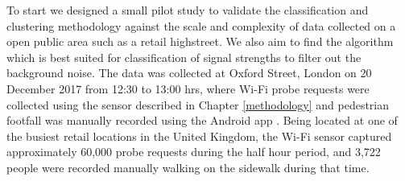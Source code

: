 To start we designed a small pilot study to validate the classification and clustering methodology against the scale and complexity of data collected on a open public area such as a retail highstreet.
We also aim to find the algorithm which is best suited for classification of signal strengths to filter out the background noise.
The data was collected at Oxford Street, London on 20 December 2017 from 12:30 to 13:00 hrs, where Wi-Fi probe requests were collected using the sensor described in Chapter \ref{methodology} and pedestrian footfall was manually recorded using the Android app \citep{bala2018clicker}.
Being located at one of the busiest retail locations in the United Kingdom, the Wi-Fi sensor captured approximately 60,000 probe requests during the half hour period, and 3,722 people were recorded manually walking on the sidewalk during that time.

